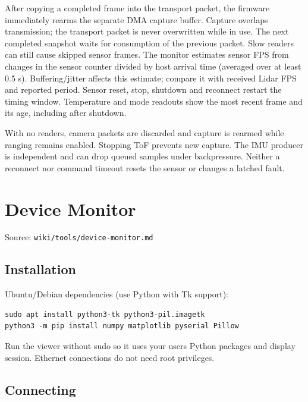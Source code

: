 \documentclass[10pt,a4paper,oneside]{report}
\begin{document}
After copying a completed frame into the transport packet, the firmware immediately rearms the separate DMA capture buffer. Capture overlaps transmission; the transport packet is never overwritten while in use. The next completed snapshot waits for consumption of the previous packet. Slow readers can still cause skipped sensor frames. The monitor estimates sensor FPS from changes in the sensor counter divided by host arrival time (averaged over at least 0.5 s). Buffering/jitter affects this estimate; compare it with received Lidar FPS and reported period. Sensor reset, stop, shutdown and reconnect restart the timing window. Temperature and mode readouts show the most recent frame and its age, including after shutdown.

With no readers, camera packets are discarded and capture is rearmed while ranging remains enabled. Stopping ToF prevents new capture. The IMU producer is independent and can drop queued samples under backpressure. Neither a reconnect nor command timeout resets the sensor or changes a latched fault.

\chapter{Device Monitor}\label{wiki-tools-device-monitor--device-monitor}

{\small\color{MGSMuted}Source: \nolinkurl{wiki/tools/device-monitor.md}\par}\medskip

\section{Installation}\label{wiki-tools-device-monitor--installation}

Ubuntu/Debian dependencies (use Python with Tk support):

\begin{verbatim}
sudo apt install python3-tk python3-pil.imagetk
python3 -m pip install numpy matplotlib pyserial Pillow
\end{verbatim}

Run the viewer without sudo so it uses your user\textquotesingle s Python packages and display session. Ethernet connections do not need root privileges.

\section{Connecting}\label{wiki-tools-device-monitor--connecting}
\end{document}
